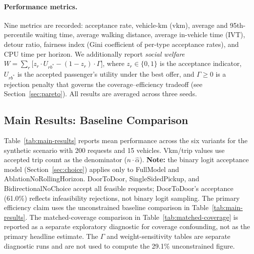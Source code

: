 \paragraph{Performance metrics.}
Nine metrics are recorded: acceptance rate, vehicle-km (vkm), average and
95th-percentile waiting time, average walking distance, average in-vehicle
time (IVT), detour ratio, fairness index (Gini coefficient of per-type
acceptance rates), and CPU time per horizon. We additionally report \emph{social welfare}
$W = \sum_{r} \bigl[z_r \cdot U_{rb^*} - (1 - z_r) \cdot \Gamma\bigr]$,
where $z_r \in \{0,1\}$ is the acceptance indicator, $U_{rb^*}$ is the
accepted passenger's utility under the best offer, and $\Gamma \geq 0$ is
a rejection penalty that governs the coverage--efficiency tradeoff (see
Section~\ref{sec:pareto}). All results are averaged across three seeds.

\subsection{Main Results: Baseline Comparison}

Table~\ref{tab:main-results} reports mean performance across the six variants
for the synthetic scenario with 200 requests and 15 vehicles.
Vkm/trip values use accepted trip count as the denominator ($n \cdot \hat{\alpha}$).
\textbf{Note:} the binary logit acceptance model (Section~\ref{sec:choice}) applies
only to FullModel and AblationNoRollingHorizon. DoorToDoor, SingleSidedPickup,
and BidirectionalNoChoice accept all feasible requests; DoorToDoor's acceptance
(61.0\%) reflects infeasibility rejections, not binary logit sampling. The
primary efficiency claim uses the unconstrained baseline comparison in
Table~\ref{tab:main-results}. The matched-coverage comparison in
Table~\ref{tab:matched-coverage} is reported as a separate exploratory diagnostic
for coverage confounding, not as the primary headline estimate. The $\Gamma$ and
weight-sensitivity tables are separate diagnostic runs and are not used to compute
the 29.1\% unconstrained figure.


